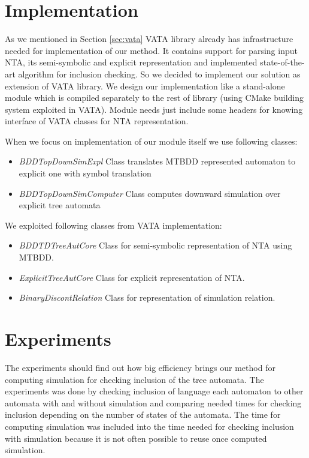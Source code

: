 \documentclass[a4paper, 12pt]{article}
\begin{document}
\section{Implementation}
\label{sec:impl}

As we mentioned in Section \ref{sec:vata} VATA library already has infrastructure needed for implementation of
our method.
It contains support for parsing input NTA, its semi-symbolic and explicit representation and implemented
state-of-the-art algorithm for inclusion checking.
So we decided to implement our solution as extension of VATA library.
We design our implementation like a stand-alone module which is compiled separately to the rest of library (using CMake building system exploited in VATA).
Module needs just include some headers for knowing interface of VATA classes for NTA representation.

When we focus on implementation of our module itself we use following classes:
\begin{itemize}
	\item \emph{BDDTopDownSimExpl} Class translates MTBDD represented automaton to explicit one with symbol translation
	\item \emph{BDDTopDownSimComputer} Class computes downward simulation over explicit tree automata
\end{itemize}

We exploited following classes from VATA implementation:

\begin{itemize}
	\item \emph{BDDTDTreeAutCore} Class for semi-symbolic representation of NTA using MTBDD.
	\item \emph{ExplicitTreeAutCore} Class for explicit representation of NTA.
	\item \emph{BinaryDiscontRelation} Class for representation of simulation relation.
\end{itemize}

\section{Experiments}
\label{sec:exps}

The experiments should find out how big efficiency brings our method for computing simulation for checking inclusion of the tree automata.
The experiments was done by checking inclusion of language each automaton to other automata with and without simulation
and comparing needed times for checking inclusion depending on the number of states of the automata.
The time for computing simulation was included into the time needed for checking inclusion with simulation
because it is not often possible to reuse once computed simulation.
\end{document}

